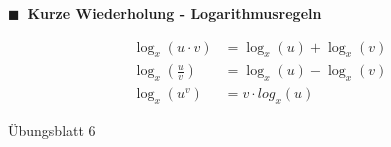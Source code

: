 \documentclass[aspectratio=169,9pt]{beamer}
\newcommand{\pp}{\par \vspace*{2mm}}
\begin{document}
\begin{frame}

{\color{miugray}$\blacksquare ~$} \textbf{Kurze Wiederholung - Logarithmusregeln} \par \vspace*{2mm}
\pp
\Large

\begin{align*}
\log_x \left( u\cdot v \right) &= \log_x(u) + \log_x(v) \\ 
\log_x \left( \frac{u}{v} \right) &= \log_x(u) - \log_x(v) \\ 
\log_x \left( u^v \right) &= v \cdot log_x(u)
\end{align*}

\end{frame}



\begin{frame}

\begin{center}
\LARGE Übungsblatt 6
\end{center}

\end{frame}
\end{document}
